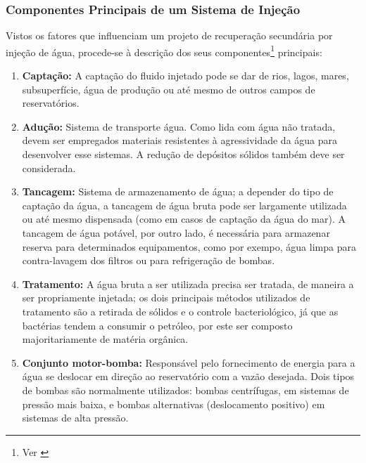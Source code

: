 \subsubsection{Componentes Principais de um Sistema de Inje\c{c}\~{a}o}

Vistos os fatores que influenciam um projeto de recupera\c{c}\~{a}o secund\'{a}ria por inje\c{c}\~{a}o de \'{a}gua, procede-se \`{a} descri\c{c}\~{a}o dos seus componentes\footnote{Ver \cite[pp. 653-659]{engres}} principais:

\begin{enumerate}
\item \textbf{Capta\c{c}\~{a}o:} A capta\c{c}\~{a}o do fluido injetado pode se dar de rios, lagos, mares, subsuperf\'{i}cie, \'{a}gua de produ\c{c}\~{a}o ou at\'{e} mesmo de outros campos de reservat\'{o}rios.

\item \textbf{Adu\c{c}\~{a}o:} Sistema de transporte \'{a}gua. Como lida com \'{a}gua n\~{a}o tratada, devem ser empregados materiais resistentes \`{a} agressividade da \'{a}gua para desenvolver esse sistemas. A redu\c{c}\~{a}o de dep\'{o}sitos s\'{o}lidos tamb\'{e}m deve ser considerada.

\item \textbf{Tancagem:} Sistema de armazenamento de \'{a}gua; a depender do tipo de capta\c{c}\~{a}o da \'{a}gua, a tancagem de \'{a}gua bruta pode ser largamente utilizada ou at\'{e} mesmo dispensada (como em casos de capta\c{c}\~{a}o da \'{a}gua do mar). A tancagem de \'{a}gua pot\'{a}vel, por outro lado, \'{e} necess\'{a}ria para armazenar reserva para determinados equipamentos, como por exempo, \'{a}gua limpa para contra-lavagem dos filtros ou para refrigera\c{c}\~{a}o de bombas.

\item \textbf{Tratamento:} A \'{a}gua bruta a ser utilizada precisa ser tratada, de maneira a ser propriamente injetada; os dois principais m\'{e}todos utilizados de tratamento s\~{a}o a retirada de s\'{o}lidos e o controle bacteriol\'{o}gico, j\'{a} que as bact\'{e}rias tendem a consumir o petr\'{o}leo, por este ser composto majoritariamente de mat\'{e}ria org\^{a}nica.

\item \textbf{Conjunto motor-bomba:} Respons\'{a}vel pelo fornecimento de energia para a \'{a}gua se deslocar em dire\c{c}\~{a}o ao reservat\'{o}rio com a vaz\~{a}o desejada. Dois tipos de bombas s\~{a}o normalmente utilizados: bombas centr\'{i}fugas, em sistemas de press\~{a}o mais baixa, e bombas alternativas (deslocamento positivo) em sistemas de alta press\~{a}o.


\end{enumerate}
